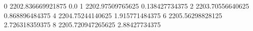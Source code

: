 0 2202.836669921875 0.0
1 2202.97509765625 0.138427734375
2 2203.70556640625 0.868896484375
4 2204.75244140625 1.915771484375
6 2205.56298828125 2.726318359375
8 2205.720947265625 2.88427734375

